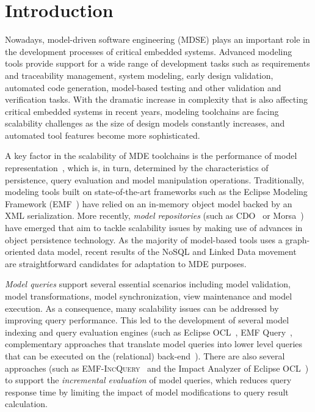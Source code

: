 \chapter*{Introduction}

Nowadays, model-driven software engineering (MDSE) plays an important role in the development processes of critical embedded systems. Advanced modeling tools provide support for a wide range of development tasks such as requirements and traceability management, system modeling, early design validation, automated code generation, model-based testing and other validation and verification tasks. With the dramatic increase in complexity that is also affecting critical embedded systems in recent years, modeling toolchains are facing scalability challenges as the size of design models constantly increases, and automated tool features become more sophisticated.

A key factor in the scalability of MDE toolchains is the performance of model representation~\cite{GrandChallengeScalability}, which is, in turn, determined by the characteristics of persistence, query evaluation and model manipulation operations. Traditionally, modeling tools built on state-of-the-art frameworks such as the Eclipse Modeling Framework (EMF~\cite{EMF}) have relied on an in-memory object model backed by an XML serialization. More recently, \emph{model repositories} (such as CDO~\cite{CDO} or Morsa~\cite{COLLAB:MORSA}) have emerged that aim to tackle scalability issues by making use of advances in object persistence technology. As the majority of model-based tools uses a graph-oriented data model, recent results of the NoSQL and Linked Data movement~\cite{neo4j,openvirtuoso,sesame} are straightforward candidates for adaptation to MDE purposes. 

\emph{Model queries} support several essential scenarios including model validation, model transformations, model synchronization, view maintenance and model execution. As a consequence, many scalability issues can be addressed by improving query performance. This led to the development of several model indexing and query evaluation engines (such as Eclipse OCL~\cite{EclipseOCL}, EMF Query~\cite{EMF:ModelQuery}, complementary approaches that translate model queries into lower level queries that can be executed on the (relational) back-end~\cite{scheidgen2012automated}). 
There are also several approaches (such as \mbox{\textsc{EMF-IncQuery}}~\cite{models10} and the Impact Analyzer of Eclipse OCL~\cite{EclipseOCL}) to support the \emph{incremental evaluation} of model queries, which reduces query response time by limiting the impact of model modifications to query result calculation.

